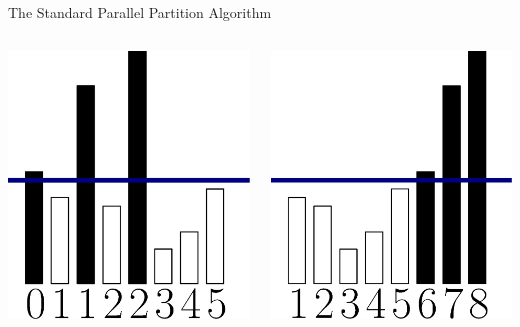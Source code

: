 \documentclass[xcolor=x11names, svgnames, rgb]{beamer}
\begin{document}
\begin{frame}[t]{The Standard Parallel Partition Algorithm}
	\begin{columns}[T] %
	\begin{column}{.5\textwidth}
		\includegraphics[width=\linewidth]{imgs/standardAlg/standardAlg2.eps}
	\end{column}
	\begin{column}{.5\textwidth}
		\includegraphics[width=\linewidth]{imgs/standardAlg/standardAlg3.eps}
	\end{column}
	\end{columns}
\end{frame}
\end{document}
